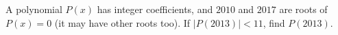 A polynomial $P(x)$ has integer coefficients, and $2010$ and $2017$ are roots of $P(x)=0$ (it may have other roots too). If $|P(2013)|<11$, find $P(2013)$.
